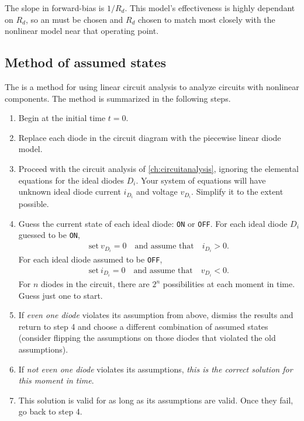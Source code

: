\documentclass[electronics.tex]{subfiles}
\begin{document}
The slope in forward-bias is $1/R_d$.
This model's effectiveness is highly dependant on $R_d$, so an  must be chosen and $R_d$ chosen to match most closely with the nonlinear model near that operating point.

\subsection{Method of assumed states}
\tags{}

The  is a method for using linear circuit analysis to analyze circuits with nonlinear components.
The method is summarized in the following steps.
\tags{}
\begin{enumerate}
  \item Begin at the initial time $t=0$.
  \item Replace each diode in the circuit diagram with the piecewise linear diode model.
  \item Proceed with the circuit analysis of \cref{ch:circuitanalysis}, ignoring the elemental equations for the ideal diodes $D_i$. Your system of equations will have unknown ideal diode current $i_{D_i}$ and voltage $v_{D_i}$. Simplify it to the extent possible.
  \item Guess the current state of each ideal diode: \texttt{ON} or \texttt{OFF}. For each ideal diode $D_i$ guessed to be \texttt{ON},
  \begin{align}
    \text{set}\ v_{D_i} = 0 \quad 
    \text{and assume that} \quad
    i_{D_i} > 0.
  \end{align} 
  For each ideal diode assumed to be \texttt{OFF},
  \begin{align}
    \text{set}\ i_{D_i} = 0 \quad 
    \text{and assume that} \quad
    v_{D_i} < 0.
  \end{align} 
	For $n$ diodes in the circuit, there are $2^n$ possibilities at each moment in time. Guess just one to start.
	\item If \emph{even one diode} violates its assumption from above, dismiss the results and return to step 4 and choose a different combination of assumed states (consider flipping the assumptions on those diodes that violated the old assumptions).
  \item If \emph{not even one diode} violates its assumptions, \emph{this is the correct solution for this moment in time}.
  \item This solution is valid for as long as its assumptions are valid. Once they fail, go back to step 4.
\end{enumerate}
\end{document}
